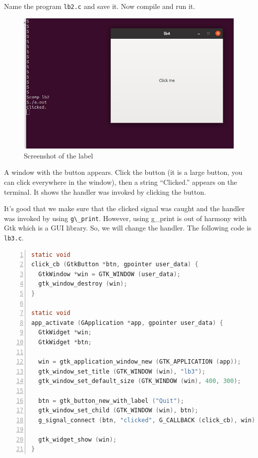 Name the program \passthrough{\lstinline!lb2.c!} and save it. Now
compile and run it.

\begin{figure}
\centering
\includegraphics[width=11.205cm,height=6.945cm]{../image/screenshot_lb2.png}
\caption{Screenshot of the label}
\end{figure}

A window with the button appears. Click the button (it is a large
button, you can click everywhere in the window), then a string
``Clicked.'' appears on the terminal. It shows the handler was invoked
by clicking the button.

It's good that we make sure that the clicked signal was caught and the
handler was invoked by using \passthrough{\lstinline!g\_print!}.
However, using g\_print is out of harmony with Gtk which is a GUI
library. So, we will change the handler. The following code is
\passthrough{\lstinline!lb3.c!}.

\begin{lstlisting}[language=C, numbers=left]
static void
click_cb (GtkButton *btn, gpointer user_data) {
  GtkWindow *win = GTK_WINDOW (user_data);
  gtk_window_destroy (win);
}

static void
app_activate (GApplication *app, gpointer user_data) {
  GtkWidget *win;
  GtkWidget *btn;

  win = gtk_application_window_new (GTK_APPLICATION (app));
  gtk_window_set_title (GTK_WINDOW (win), "lb3");
  gtk_window_set_default_size (GTK_WINDOW (win), 400, 300);

  btn = gtk_button_new_with_label ("Quit");
  gtk_window_set_child (GTK_WINDOW (win), btn);
  g_signal_connect (btn, "clicked", G_CALLBACK (click_cb), win);

  gtk_widget_show (win);
}
\end{lstlisting}

